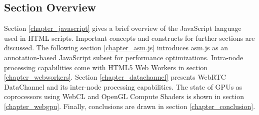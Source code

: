 \subsection{Section Overview}

Section \ref{chapter_javascript} gives a brief overview of the JavaScript language used in HTML scripts. Important concepts and constructs for further sections are discussed. The following section \ref{chapter_asm.js} introduces asm.js as an annotation-based JavaScript subset for performance optimizations. Intra-node processing capabilities come with HTML5 Web Workers in section \ref{chapter_webworkers}. Section \ref{chapter_datachannel} presents WebRTC DataChannel and its inter-node processing capabilities. The state of GPUs as coprocessors using WebCL and OpenGL Compute Shaders is shown in section \ref{chapter_webgpu}. Finally, conclusions are drawn in section \ref{chapter_conclusion}.
